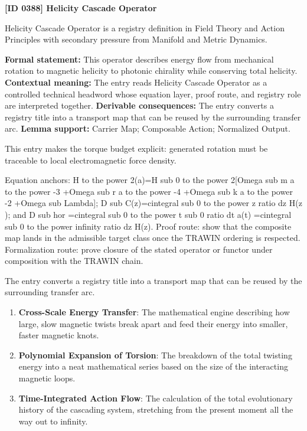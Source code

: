 \clearpage
\noindent\textbf{[ID 0388] Helicity Cascade Operator}\par
\vspace{0.35em}
\begingroup\small
{}
Helicity Cascade Operator is a registry definition in Field Theory and Action Principles with secondary pressure from Manifold and Metric Dynamics.

\begingroup\footnotesize\setlength{\emergencystretch}{3em}\sloppy
\textbf{Formal statement:} This operator describes energy flow from mechanical rotation to magnetic helicity to photonic chirality while conserving total helicity. \textbf{Contextual meaning:} The entry reads Helicity Cascade Operator as a controlled technical headword whose equation layer, proof route, and registry role are interpreted together. \textbf{Derivable consequences:} The entry converts a registry title into a transport map that can be reused by the surrounding transfer arc. \textbf{Lemma support:} Carrier Map; Composable Action; Normalized Output.\par
\endgroup

This entry makes the torque budget explicit: generated rotation must be traceable to local electromagnetic force density.

Equation anchors: H to the power 2(a)=H sub 0 to the power 2[Omega sub m a to the power -3 +Omega sub r a to the power -4 +Omega sub k a to the power -2 +Omega sub Lambda]; D sub C(z)=cintegral sub 0 to the power z ratio dz H(z ); and D sub hor =cintegral sub 0 to the power t sub 0 ratio dt a(t) =cintegral sub 0 to the power infinity ratio dz H(z). Proof route: show that the composite map lands in the admissible target class once the TRAWIN ordering is respected. Formalization route: prove closure of the stated operator or functor under composition with the TRAWIN chain.

The entry converts a registry title into a transport map that can be reused by the surrounding transfer arc.
\endgroup

\begin{enumerate}[leftmargin=1.6em,itemsep=6pt,topsep=4pt]
\item \textbf{Cross-Scale Energy Transfer}: The mathematical engine describing how large, slow magnetic twists break apart and feed their energy into smaller, faster magnetic knots.
\item \textbf{Polynomial Expansion of Torsion}: The breakdown of the total twisting energy into a neat mathematical series based on the size of the interacting magnetic loops.
\item \textbf{Time-Integrated Action Flow}: The calculation of the total evolutionary history of the cascading system, stretching from the present moment all the way out to infinity.
\end{enumerate}

